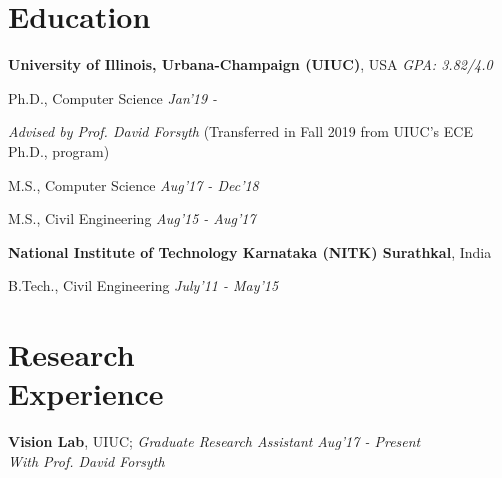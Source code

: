 \documentclass[margin,line]{res}
\newenvironment{list1}{
  \begin{list}{\ding{113}}{%
      \setlength{\itemsep}{0in}
      \setlength{\parsep}{0in} \setlength{\parskip}{0in}
      \setlength{\topsep}{0in} \setlength{\partopsep}{0in} 
      \setlength{\leftmargin}{0.17in}}}{\end{list}}
\begin{document}
\begin{resume}
\section{\sc \large Education}
{\bf University of Illinois, Urbana-Champaign (UIUC)}, USA 
\hfill{\em GPA: 3.82/4.0}
\\ \vspace*{-.12in}
\begin{list1}
\item[] Ph.D., Computer Science \hfill{\em Jan'19 - }
\item[] {\em Advised by Prof. David Forsyth} \hfill {\scriptsize  (Transferred in Fall 2019 from UIUC's ECE Ph.D., program)}\\\vspace*{-.1in}
\item[] M.S., Computer Science \hfill{\em Aug'17 - Dec'18}
\item[] M.S., Civil Engineering \hfill{\em Aug'15 - Aug'17}
\end{list1}
{\bf National Institute of Technology Karnataka (NITK) Surathkal}, India
\\\vspace*{-.12in}
\begin{list1}
\item[] B.Tech., Civil Engineering \hfill{\em July'11 - May'15}
\end{list1}
\section{\sc \large Research \\ Experience}
{\bf Vision Lab},  UIUC; {\em Graduate Research Assistant}  \hfill  {\em Aug'17 - Present}\\
{\em With Prof. David Forsyth}


\end{resume}
\end{document}
